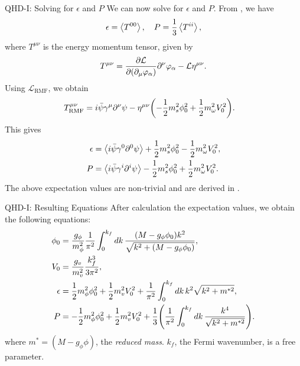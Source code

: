 \documentclass[]{beamer}
\newcommand{\Letter}[1]{\mathcal{#1}}
\newcommand{\Lag}{\Letter{L}}
\newcommand{\p}{\partial}
\begin{document}
    \begin{frame}{QHD-I: Solving for $\epsilon$ and $P$}
        \pause
        We can now solve for $\epsilon$ and $P$. \pause From \autocite{diener_2008}, we have
        \[\epsilon = \expval{T^{00}}, \quad P = \frac{1}{3}\expval{T^{ii}},\]
        where $T^{\mu\nu}$ is the energy momentum tensor, given by
        \vspace{-5pt}
        \begin{align*}
            T^{\mu\nu} = \pdv{\Lag}{(\p_\mu \varphi_\alpha)}\p^\nu \varphi_\alpha - \Lag \eta^{\mu\nu}.
        \end{align*} \pause
        \vspace{-5pt}
        Using $\Lag_\text{RMF}$, we obtain
        \vspace{-5pt}
        \begin{align*}
            T^{\mu\nu}_\text{RMF} & =i\bar\psi\gamma^\mu \p^\nu \psi - \eta^{\mu\nu} \pqty{- \frac{1}{2} m_s^2 \phi_0^2 + \frac{1}{2} m_\omega^2 V_0^2}.
        \end{align*} \pause
        \vspace{-5pt}
        This gives
        \vspace{-15pt}
        \begin{align*}
            \epsilon & = \expval{i\bar\psi\gamma^0 \p^0 \psi} + \frac{1}{2} m_s^2 \phi_0^2 - \frac{1}{2} m_\omega^2 V_0^2,\\
            P & = \expval{i\bar\psi\gamma^i \p^i \psi}  - \frac{1}{2} m_s^2 \phi_0^2 + \frac{1}{2} m_\omega^2 V_0^2.
        \end{align*} \pause
        The above expectation values are non-trivial and are derived in \autocite{diener_2008}.
    \end{frame}

    \begin{frame}{QHD-I: Resulting Equations}
        \pause
        After calculation the expectation values, we obtain the following equations: \pause
        \begin{align*}
            \phi_0 &= \frac{g_\phi}{m_\phi^2} \frac{1}{\pi^2} \int_0^{k_f} \dd{k} \frac{(M-g_\phi \phi_0) k^2 }{\sqrt{k^2 + (M-g_\phi \phi_0)}},  \\
            V_0 &= \frac{g_v}{m_v^2} \frac{k_f^3}{3\pi^2}, \\
            \epsilon & = \frac{1}{2} m_\phi^2 \phi_0^2 + \frac{1}{2} m_v^2 V_0^2 + \frac{1}{\pi^2} \int_0^{k_f} \dd{k} k^2 \sqrt{k^2 + m^{*2}},\\
            P & = -\frac{1}{2} m_\phi^2 \phi_0^2 + \frac{1}{2} m_v^2 V_0^2 + \frac{1}{3} \pqty{\frac{1}{\pi^2} \int_0^{k_f} \dd{k}\frac{k^4}{\sqrt{k^2 + m^{*2}}}}.
        \end{align*}
        where $m^* = (M-g_\phi \phi)$, the \textit{reduced mass}. \pause $k_f$, the Fermi wavenumber, is a free parameter. 
    \end{frame}
\end{document}
